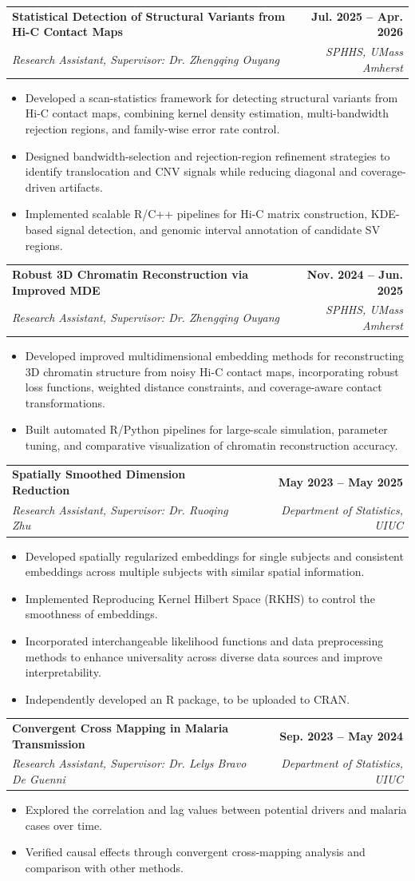 \documentclass[letterpaper,11pt]{article}
\makeatletter
\newcommand{\resumeItem}[1]{
  \item\small{
    {#1 \vspace{-2pt}}
  }
}
\newcommand{\resumeSubheading}[4]{
  \vspace{-2pt}\item
    \begin{tabular*}{1.0\textwidth}[t]{l@{\extracolsep{\fill}}r}
      \textbf{#1} & \textbf{\small #2} \\
      \textit{\small#3} & \textit{\small #4} \\
    \end{tabular*}\vspace{-7pt}
}
\newcommand{\resumeItemListStart}{\begin{itemize}}
\newcommand{\resumeItemListEnd}{\end{itemize}\vspace{-5pt}}
\makeatother
\begin{document}
\resumeSubheading
{Statistical Detection of Structural Variants from Hi-C Contact Maps}{Jul. 2025 -- Apr. 2026}
{Research Assistant, Supervisor: Dr. Zhengqing Ouyang}{SPHHS, UMass Amherst}
\resumeItemListStart
\resumeItem{Developed a scan-statistics framework for detecting structural variants from Hi-C contact maps, combining kernel density estimation, multi-bandwidth rejection regions, and family-wise error rate control.}
\resumeItem{Designed bandwidth-selection and rejection-region refinement strategies to identify translocation and CNV signals while reducing diagonal and coverage-driven artifacts.}
\resumeItem{Implemented scalable R/C++ pipelines for Hi-C matrix construction, KDE-based signal detection, and genomic interval annotation of candidate SV regions.}
\resumeItemListEnd

\resumeSubheading
{Robust 3D Chromatin Reconstruction via Improved MDE}{Nov. 2024 -- Jun. 2025}
{Research Assistant, Supervisor: Dr. Zhengqing Ouyang}{SPHHS, UMass Amherst}
\resumeItemListStart
\resumeItem{Developed improved multidimensional embedding methods for reconstructing 3D chromatin structure from noisy Hi-C contact maps, incorporating robust loss functions, weighted distance constraints, and coverage-aware contact transformations.}
\resumeItem{Built automated R/Python pipelines for large-scale simulation, parameter tuning, and comparative visualization of chromatin reconstruction accuracy.}
\resumeItemListEnd

\resumeSubheading
{Spatially Smoothed Dimension Reduction}{May 2023 -- May 2025}
{Research Assistant, Supervisor: Dr. Ruoqing Zhu}{Department of Statistics, UIUC}
\resumeItemListStart
\resumeItem{Developed spatially regularized embeddings for single subjects and consistent embeddings across multiple subjects with similar spatial information.}
\resumeItem{Implemented Reproducing Kernel Hilbert Space (RKHS) to control the smoothness of embeddings.}
\resumeItem{Incorporated interchangeable likelihood functions and data preprocessing methods to enhance universality across diverse data sources and improve interpretability.}
\resumeItem{Independently developed an R package, to be uploaded to CRAN.}
\resumeItemListEnd

\resumeSubheading
{Convergent Cross Mapping in Malaria Transmission}{Sep. 2023 -- May 2024}
{Research Assistant, Supervisor: Dr. Lelys Bravo De Guenni}{Department of Statistics, UIUC}
\resumeItemListStart
\resumeItem{Explored the correlation and lag values between potential drivers and malaria cases over time.}
\resumeItem{Verified causal effects through convergent cross-mapping analysis and comparison with other methods.}
\resumeItemListEnd
\end{document}
